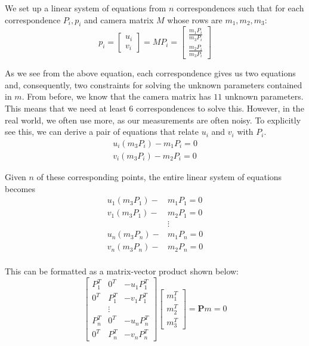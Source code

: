 \documentclass[a4paper, 12pt]{article}
\begin{document}
We set up a linear system of equations from $n$ correspondences such that for each correspondence $P_i, p_i$ and camera matrix $M$ whose rows are $m_1, m_2, m_3$:
\begin{equation}
p_i = \begin{bmatrix}u_i\\v_i\end{bmatrix} = MP_i = \begin{bmatrix}\frac{m_1 P_i}{m_3P_i}\\\frac{m_2 P_i}{m_3P_i}\end{bmatrix}
\end{equation}

As we see from the above equation, each correspondence gives us two equations and, consequently, two constraints for solving the unknown parameters contained in $m$. From before, we know that the camera matrix has $11$ unknown parameters. This means that we need at least $6$ correspondences to solve this. However, in the real world, we often use more, as our measurements are often noisy. To explicitly see this, we can derive a pair of equations that relate $u_i$ and $v_i$ with $P_i$. 
\begin{align*}
u_i(m_3P_i) - m_1P_i = 0\\
v_i(m_3P_i) - m_2P_i = 0
\end{align*}

Given $n$ of these corresponding points, the entire linear system of equations becomes
\begin{align*}
u_1(m_3P_1) -& m_1P_1 = 0\\
v_1(m_3P_1) -& m_2P_1 = 0\\
&\vdots\\
u_n(m_3P_n) -& m_1P_n = 0\\
v_n(m_3P_n) -& m_2P_n = 0\\
\end{align*}

This can be formatted as a matrix-vector product shown below:
\begin{equation}
\begin{bmatrix} 
P_1^T & 0^T & -u_1P_1^T \\
0^T & P_1^T & -v_1P_1^T \\
& \vdots &\\
P_n^T & 0^T & -u_nP_n^T \\
0^T & P_n^T & -v_nP_n^T 
\end{bmatrix}
\begin{bmatrix}
m_1^T \\ m_2^T \\m_3^T
\end{bmatrix} = \mathbf{P}m = 0
\label{eq:linearsystem}
\end{equation}
\end{document}
